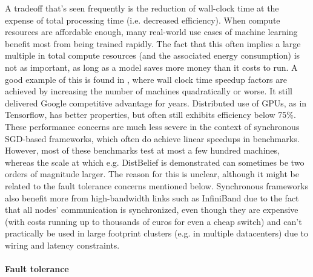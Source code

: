 A tradeoff that’s seen frequently is the reduction of wall-clock time at the expense of total processing time (i.e. decreased efficiency). When compute resources are affordable enough, many real-world use cases of machine learning benefit most from being trained rapidly. The fact that this often implies a large multiple in total compute resources (and the associated energy consumption) is not as important, as long as a model saves more money than it costs to run.  A good example of this is found in \citet{DistBelief2012}, where wall clock time speedup factors are achieved by increasing the number of machines quadratically or worse. It still delivered Google competitive advantage for years. Distributed use of GPUs, as in Tensorflow, has better properties, but often still exhibits efficiency below 75\%.
These performance concerns are much less severe in the context of synchronous SGD-based frameworks, which often do achieve linear speedups in benchmarks. However, most of these benchmarks test at most a few hundred machines, whereas the scale at which e.g. DistBelief is demonstrated can sometimes be two orders of magnitude larger. The reason for this is unclear, although it might be related to the fault tolerance concerns mentioned below. Synchronous frameworks also benefit more from high-bandwidth links such as InfiniBand due to the fact that all nodes' communication is synchronized, even though they are expensive (with costs running up to thousands of euros for even a cheap switch) and can't practically be used in large footprint clusters (e.g. in multiple datacenters) due to wiring and latency constraints.

\paragraph{Fault tolerance}

